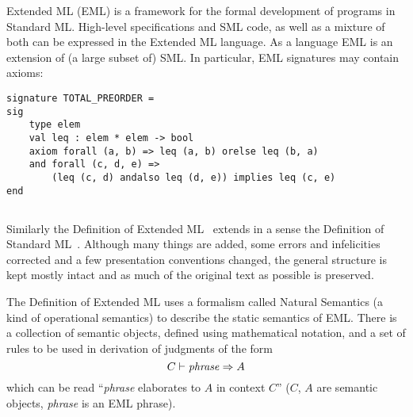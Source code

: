 Extended ML (EML) \cite{bib:KST94} is a framework for the formal development of programs in Standard ML.
High-level specifications and SML code, 
as well as a mixture of both can be expressed in the Extended ML language.
As a language EML is an extension of (a large subset of) SML.
In particular, EML signatures may contain axioms:

\begin{verbatim}
signature TOTAL_PREORDER =
sig
    type elem 
    val leq : elem * elem -> bool 
    axiom forall (a, b) => leq (a, b) orelse leq (b, a)
    and forall (c, d, e) => 
        (leq (c, d) andalso leq (d, e)) implies leq (c, e)
end
\end{verbatim}

\subsection{\secformal}
\label{sec:formal}

{
Similarly the Definition of Extended ML~\cite{bib:KST94} extends in a sense
the Definition of Standard ML~\cite{MTH90}. Although many things are added,
some errors and infelicities corrected and a few presentation 
conventions changed, the general structure is kept mostly intact 
and as much of the original text as possible is preserved. 

The Definition of Extended ML uses a formalism called Natural Semantics 
(a kind of operational semantics) to describe the static semantics of EML.
There is a collection of semantic objects, defined using mathematical notation,
and a set of rules to be used in derivation of judgments of the form
\[C\vdash{\it phrase}\Rightarrow A\]
which can be read ``{\it phrase} elaborates to $A$ in context $C$''
($C$, $A$ are semantic objects, {\it phrase} is an EML phrase).
}
{}

\subsection{\seckit}
\label{sec:kit}

